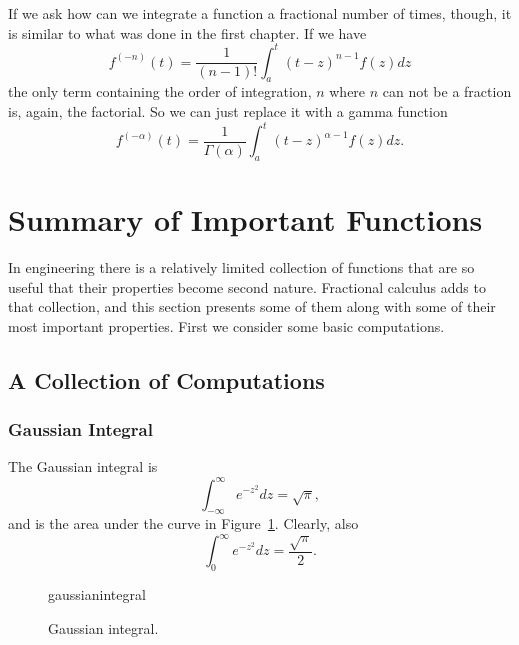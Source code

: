 If we ask how can we integrate a function a fractional number of times, though, it is similar to what was done in the first chapter. If we have
\begin{equation*}
  f^{(-n)}(t) = \frac{1}{\left( n - 1 \right)!} \int_a^t \left( t - z \right)^{n-1} f(z) dz
\end{equation*}
the only term containing the order of integration, $n$ where $n$ can not be a fraction is, again, the factorial. So we can just replace it with a gamma function 
\begin{equation}
  \boxed{ f^{(-\alpha)}(t) = \frac{1}{\Gamma \left( \alpha \right)} \int_a^t \left( t - z \right)^{\alpha-1} f(z) dz. }
  \label{eq:fracint}
\end{equation}

\section{Summary of Important Functions}

In engineering there is a relatively limited collection of functions that are so useful that their properties become second nature. Fractional calculus adds to that collection, and this section presents some of them along with some of their most important properties. First we consider some basic computations.

\subsection{A Collection of Computations}

\subsubsection{Gaussian Integral}
The Gaussian integral is
\begin{equation}
  \int_{-\infty}^\infty e^{-z^2} dz = \sqrt{\pi},
  \label{eq:gaussianintegral}
\end{equation}
and is the area under the curve in Figure~\ref{fig:gaussianintegral}. Clearly, also
\begin{equation*}
  \int_0^\infty e^{-z^2} dz = \frac{\sqrt{\pi}}{2}.
\end{equation*}

\begin{figure}
  \centering
  {gaussianintegral}
  \caption{Gaussian integral.}
\label{fig:gaussianintegral}
\end{figure}


